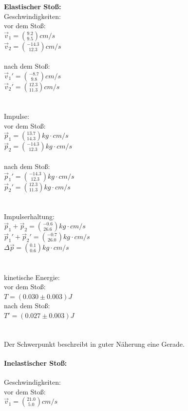 \documentclass[12pt,a4paper]{article}
\begin{document}
\begin{multicols}{2}

\noindent \textbf{Elastischer Stoß:}\\

\noindent Geschwindigkeiten:\\
vor dem Stoß:\\
$\vec v_1 =\binom{9.2}{9.5} cm/s$\\
$\vec v_2 =\binom{-14.3}{12.3} cm/s$\\
\\
nach dem Stoß:\\
$\vec v_1' =\binom{-8.7}{9.8} cm/s$\\
$\vec v_2 '=\binom{12.3}{11.3} cm/s$\\
\\
\\
Impulse:\\
vor dem Stoß:\\
$\vec p_1 =\binom{13.7}{14.3} kg\cdot cm/s$\\
$\vec p_2 =\binom{-14.3}{12.3} kg\cdot cm/s$\\
\\
nach dem Stoß:\\
$\vec p_1' =\binom{-14.3}{12.3} kg\cdot cm/s$\\
$\vec p_2 '=\binom{12.3}{11.3} kg\cdot cm/s$\\
\\
\\
Impulserhaltung:\\
$\vec p_1 + \vec p_2 = \binom{-0.6}{26.6} kg\cdot cm/s$\\
$\vec p_1' + \vec p_2' = \binom{-0.7}{26.0} kg\cdot cm/s$\\
$\Delta \vec p =  \binom{0.1}{0.6} kg\cdot cm/s$\\
\\
\\
kinetische Energie:\\
vor dem Stoß:\\
$T = (0.030 \pm 0.003) J$\\
nach dem Stoß:\\
$T'=(0.027 \pm 0.003) J$\\
\\
\\
Der Schwerpunkt beschreibt in guter Näherung eine Gerade.\\
\\
\textbf{Inelastischer Stoß:}\\
\\
\noindent Geschwindigkeiten:\\
vor dem Stoß:\\
$\vec v_1 =\binom{21.0}{5.0} cm/s$\\


\end{multicols}
\end{document}
